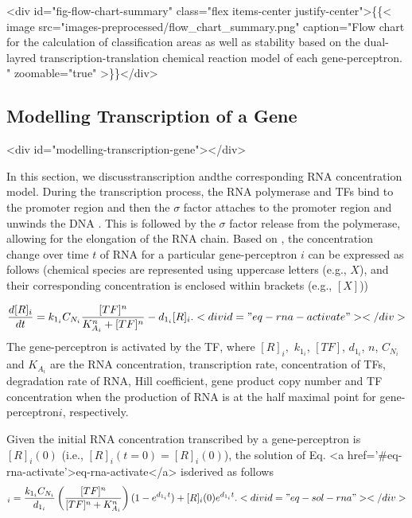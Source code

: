 \documentclass[twocolumn]{biophys-new}
\begin{document}
{{<div id="fig-flow-chart-summary" class="flex items-center justify-center">\{\{< image src="images-preprocessed/flow_chart_summary.png" caption="Flow chart for the calculation of classification areas as well as stability based on the dual-layred transcription-translation chemical reaction model of each gene-perceptron. \vspace{1em}" zoomable="true" >\}\}</div>


\subsection{Modelling Transcription of a Gene} <div id="modelling-transcription-gene"></div>

In this section, we discusstranscription andthe corresponding RNA concentration model.
During the transcription process, the RNA polymerase and TFs bind to the promoter region 
and then the $\sigma$ factor attaches to the promoter region and unwinds the DNA \cite{cao2020stochastic}. This is followed by the $\sigma$ factor release from the polymerase, allowing for the elongation of the RNA chain.
Based on \cite{santillan2008use}, the concentration change over time $t$ of RNA for a particular gene-perceptron $i$ can be expressed as follows (chemical species are represented using uppercase letters (e.g., $X$), and their corresponding concentration is enclosed within brackets (e.g., $[X]$)) 
 
\begin{equation}
\dfrac{d[R]_i}{dt}= k_{1_i} C_{N_i} \dfrac{[TF]^n}{K_{A_i}^n + [TF]^n}- d_{1_i} [R]_i. <div id="eq-rna-activate"></div>

\end{equation}
The gene-perceptron is activated by the TF, where $[R]_i,$ $k_{1_i}$, $[TF]$, $d_{1_i}$, $n$, $C_{N_i}$ and $K_{A_i}$ are the RNA concentration, transcription rate, concentration of TFs, degradation rate of RNA, Hill coefficient, gene product copy number and TF concentration when the production of RNA is at the half maximal point for gene-perceptron$i$, respectively.

Given the initial RNA concentration transcribed by a gene-perceptron is $[R]_i(0)$ (i.e., $[R]_i(t=0)=[R]_i(0)$), the solution of Eq. <a href='#eq-rna-activate'>eq-rna-activate</a> isderived as follows
\begin{equation}
[R]_i= \dfrac{k_{1_i} C_{N_i}}{d_{1_i}}\left(\dfrac{[TF]^n}{[TF]^n+K_{A_i}^n} \right) (1-e^{d_{1_i}t}) + [R]_i(0) e^{d_{1_i}t}. <div id="eq-sol-rna"></div>


\end{equation}}}
\end{document}
